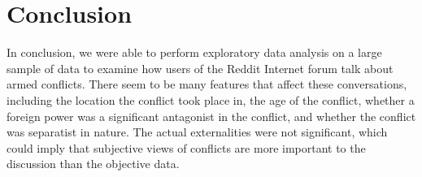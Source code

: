 \section{Conclusion}
In conclusion, we were able to perform exploratory data analysis on a large sample of data to examine how users of the Reddit Internet forum talk about armed conflicts. There seem to be many features that affect these conversations, including the location the conflict took place in, the age of the conflict, whether a foreign power was a significant antagonist in the conflict, and whether the conflict was separatist in nature. The actual externalities were not significant, which could imply that subjective views of conflicts are more important to the discussion than the objective data.  
